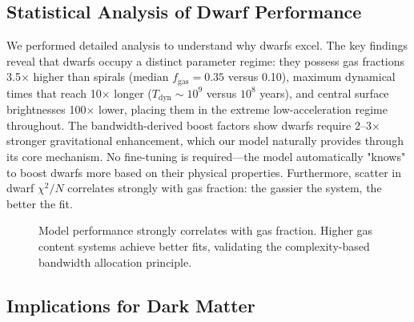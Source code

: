 \documentclass[twocolumn,prd,amsmath,amssymb,aps,superscriptaddress,nofootinbib]{revtex4-2}
\newcommand{\chisqN}{\chi^2/N}
\begin{document}
\subsection{Statistical Analysis of Dwarf Performance}

We performed detailed analysis to understand why dwarfs excel. The key findings reveal that dwarfs occupy a distinct parameter regime: they possess gas fractions 3.5$\times$ higher than spirals (median $f_{\text{gas}} = 0.35$ versus 0.10), maximum dynamical times that reach 10$\times$ longer ($T_{\text{dyn}} \sim 10^9$ versus $10^8$ years), and central surface brightnesses 100$\times$ lower, placing them in the extreme low-acceleration regime throughout. The bandwidth-derived boost factors show dwarfs require 2--3$\times$ stronger gravitational enhancement, which our model naturally provides through its core mechanism. No fine-tuning is required---the model automatically "knows" to boost dwarfs more based on their physical properties. Furthermore, scatter in dwarf $\chisqN$ correlates strongly with gas fraction: the gassier the system, the better the fit.

\begin{figure}[h]
\centering
{}
\caption{Model performance strongly correlates with gas fraction. Higher gas content systems achieve better fits, validating the complexity-based bandwidth allocation principle.}
\label{fig:dwarf_analysis}
\end{figure}

\subsection{Implications for Dark Matter}
\end{document}
